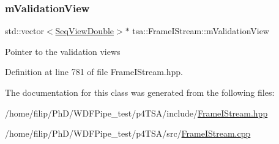 \subsubsection{\texorpdfstring{m\+Validation\+View}{mValidationView}}
{\footnotesize\ttfamily std\+::vector$<$\hyperlink{namespacetsa_ac599574bcc094eda25613724b8f3ca9e}{Seq\+View\+Double}$>$$\ast$ tsa\+::\+Frame\+I\+Stream\+::m\+Validation\+View\hspace{0.3cm}{\ttfamily [private]}}

Pointer to the validation views 

Definition at line 781 of file Frame\+I\+Stream.\+hpp.



The documentation for this class was generated from the following files\+:\begin{DoxyCompactItemize}
\item 
/home/filip/\+Ph\+D/\+W\+D\+F\+Pipe\+\_\+test/p4\+T\+S\+A/include/\hyperlink{_frame_i_stream_8hpp}{Frame\+I\+Stream.\+hpp}\item 
/home/filip/\+Ph\+D/\+W\+D\+F\+Pipe\+\_\+test/p4\+T\+S\+A/src/\hyperlink{_frame_i_stream_8cpp}{Frame\+I\+Stream.\+cpp}\end{DoxyCompactItemize}
